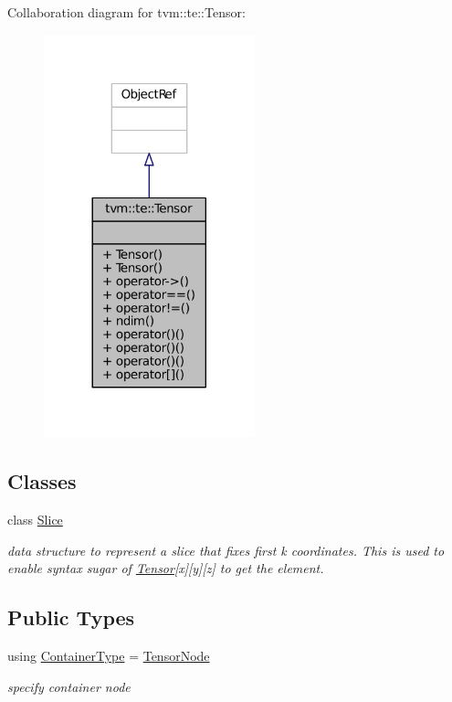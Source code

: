 Collaboration diagram for tvm\+:\+:te\+:\+:Tensor\+:
\nopagebreak
\begin{figure}[H]
\begin{center}
\leavevmode
\includegraphics[width=173pt]{classtvm_1_1te_1_1Tensor__coll__graph}
\end{center}
\end{figure}
\subsection*{Classes}
\begin{DoxyCompactItemize}
\item 
class \hyperlink{classtvm_1_1te_1_1Tensor_1_1Slice}{Slice}
\begin{DoxyCompactList}\small\item\em data structure to represent a slice that fixes first k coordinates. This is used to enable syntax sugar of \hyperlink{classtvm_1_1te_1_1Tensor}{Tensor}\mbox{[}x\mbox{]}\mbox{[}y\mbox{]}\mbox{[}z\mbox{]} to get the element. \end{DoxyCompactList}\end{DoxyCompactItemize}
\subsection*{Public Types}
\begin{DoxyCompactItemize}
\item 
using \hyperlink{classtvm_1_1te_1_1Tensor_a79078835ab113994887e66878e2a87ab}{Container\+Type} = \hyperlink{classtvm_1_1te_1_1TensorNode}{Tensor\+Node}
\begin{DoxyCompactList}\small\item\em specify container node \end{DoxyCompactList}\end{DoxyCompactItemize}

